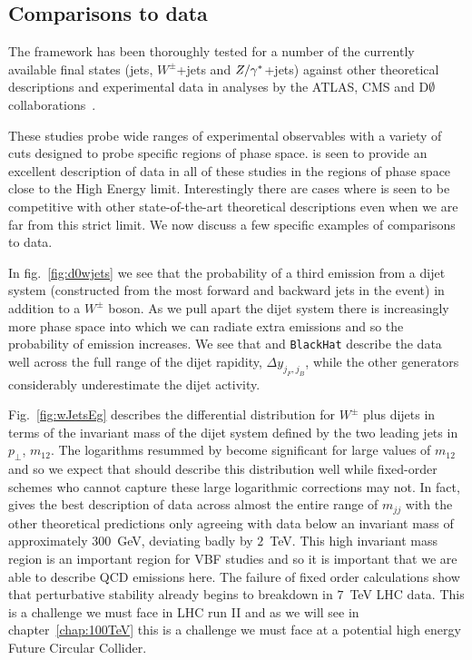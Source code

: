 	\subsection{Comparisons to data}

		The \hej framework has been thoroughly tested for a number of the currently available final states (jets,
		$W^\pm$+jets and $Z/\gamma^*$+jets) against other theoretical descriptions and experimental data in analyses
		by the ATLAS, CMS and D$\emptyset$ collaborations~\cite{Aad:2011jz,Aad:2014pua,Aad:2014qxa,Aad:2014rta,
		Chatrchyan:2012gwa,Abazov:2013gpa,ZPaper}.

		These studies probe wide ranges of experimental observables with a variety of cuts designed to probe
		specific regions of phase space. \hej is seen to provide an excellent description of data in all of these
		studies in the regions of phase space close to the High Energy limit.  Interestingly there are cases where
		\HEJ is seen to be competitive with other state-of-the-art theoretical descriptions even when we are far from
		this strict limit. We now discuss a few specific examples of comparisons to data.

		In fig.~\eqref{fig:d0wjets} we see that the probability of a third emission from a dijet system (constructed
		from the most forward and backward jets in the event) in addition to a $W^\pm$ boson.  As we pull apart the
		dijet system there is increasingly more phase space into which we can radiate extra emissions and so the
		probability of emission increases.  We see that \HEJ and \texttt{BlackHat} describe the data well across
		the full range of the dijet rapidity, $\Delta y_{j_F, j_B}$, while the other generators considerably
		underestimate the dijet activity.

		Fig.~\eqref{fig:wJetsEg} describes the differential distribution for $W^\pm$ plus dijets in terms of the
		invariant mass of the dijet system defined by the two leading jets in $p_\perp$, $m_{12}$.  The logarithms
		resummed by \hej become significant for large values of $m_{12}$ and so we expect that \HEJ should
		describe this distribution well while fixed-order schemes who cannot capture these large logarithmic
		corrections may not. In fact, \HEJ gives the best description of data across almost the entire range of $m_{jj}$
		with the other theoretical predictions only agreeing with data below an invariant mass of approximately $300$~GeV,
		deviating badly by $2$~TeV.  This high invariant mass region is an important region for VBF studies and so it
		is important that we are able to describe QCD emissions here.  The failure of fixed order calculations show that
		perturbative stability already begins to breakdown in $7$~TeV LHC data.  This is a challenge we must face in LHC
		run II and as we will see in chapter~\ref{chap:100TeV} this is a challenge we must face at a potential high
		energy Future Circular Collider.

